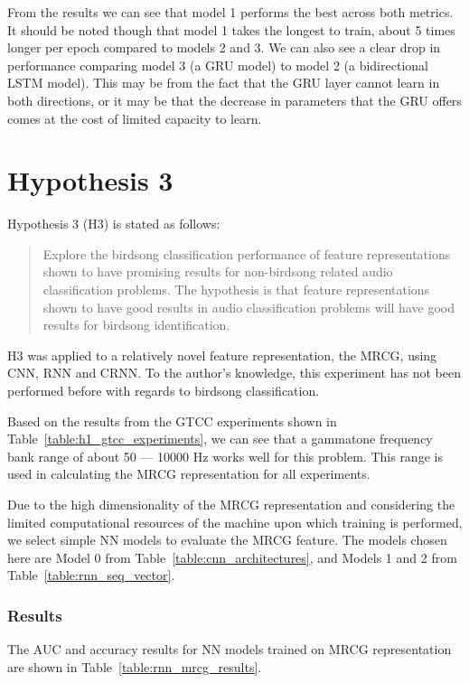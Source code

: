 From the results we can see that model 1 performs the best across both metrics.
It should be noted though that model 1 takes the longest to train, about 5 times
longer per epoch compared to models 2 and 3. We can also see a clear drop in
performance comparing model 3 (a GRU model) to model 2 (a bidirectional LSTM
model). This may be from the fact that the GRU layer cannot learn in both
directions, or it may be that the decrease in parameters that the GRU offers
comes at the cost of limited capacity to learn.

\section{Hypothesis 3}

Hypothesis 3 (H3) is stated as follows:

\begin{quote}
Explore the birdsong classification performance of feature representations
\\shown to have promising results for non-birdsong related audio classification
problems. The hypothesis is that feature representations shown to have good
results in audio classification problems will have good results for birdsong
identification.
\end{quote}

H3 was applied to a relatively novel feature representation, the MRCG, using
CNN, RNN and CRNN\@. To the author's knowledge, this experiment has not been
performed before with regards to birdsong classification.

Based on the results from the GTCC experiments shown in
Table~\ref{table:h1_gtcc_experiments}, we can see that a gammatone frequency
bank range of about 50 --- 10000 Hz works well for this problem. This range is
used in calculating the MRCG representation for all experiments.

Due to the high dimensionality of the MRCG representation and considering the
limited computational resources of the machine upon which training is performed,
we select simple NN models to evaluate the MRCG feature. The models chosen here
are Model 0 from Table~\ref{table:cnn_architectures}, and Models 1 and 2 from
Table~\ref{table:rnn_seq_vector}.

\subsubsection{Results}

The AUC and accuracy results for NN models trained on MRCG representation are
shown in Table~\ref{table:rnn_mrcg_results}.

